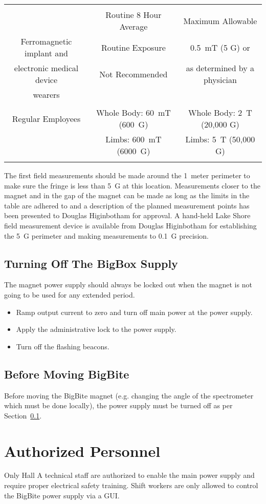 {\tiny
\begin{tabular}{ccc}
				& & \\
	& Routine 8 Hour Average & Maximum Allowable \\
Ferromagnetic implant and & Routine Exposure & 0.5~mT (5 G) or \\
electronic medical device & Not Recommended  & as determined by a physician \\
wearers                   & &  \\
				& & \\
Regular Employees	& Whole Body: 60~mT (600~G)     & Whole Body: 2~T (20,000 G) \\  
	                & Limbs: 600~mT (6000~G)	& Limbs: 5~T (50,000 G) \\
				& & \\
\end{tabular}
}

The first field measurements should be made around the 1~meter perimeter to make sure the fringe is less than 5~G at
this location.  Measurements closer to the magnet and in the gap of the magnet can
be made as long as the limits in the table are adhered to and a description of the planned measurement points
has been presented to Douglas Higinbotham for approval.
A hand-held Lake Shore field measurement device is available from Douglas Higinbotham 
for establishing the 5~G perimeter
and making measurements to 0.1~G precision.


\subsection{Turning Off The BigBox Supply}
\label{off}

The magnet power supply should always be locked out when the magnet is not going 
to be used for any extended period.

\begin{itemize}
\item{Ramp output current to zero and turn off main power at the power supply.}
\item{Apply the administrative lock to the power supply.}
\item{Turn off the flashing beacons.}
\end{itemize}

\subsection{Before Moving BigBite}

Before moving the BigBite magnet (e.g. changing the angle of the spectrometer which must
be done locally), the power supply must be turned off as per Section~\ref{off}.   

\clearpage
\section{Authorized Personnel}

Only Hall A technical staff are authorized to enable the main power supply and require
proper electrical safety training.  Shift workers are only allowed to control 
the BigBite power supply via a GUI.  


